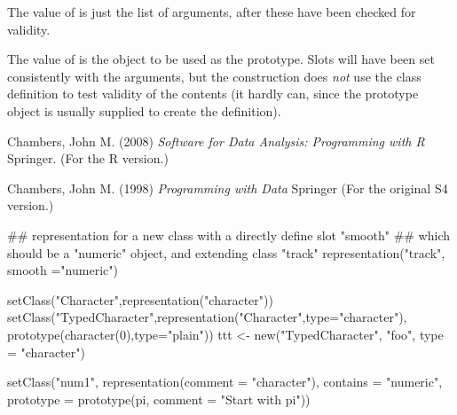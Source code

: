 %
\begin{Value}
The value of   is just the list of arguments, after these have been checked
for validity.

The value of  is the object to be used as the
prototype.  Slots will have been set consistently with the
arguments, but the construction does \emph{not} use the class
definition to test validity of the contents (it hardly can, since
the prototype object is usually supplied to create the definition).
\end{Value}
%
\begin{References}\relax
Chambers, John M. (2008)
\emph{Software for Data Analysis: Programming with R}
Springer.  (For the R version.)

Chambers, John M. (1998)
\emph{Programming with Data}
Springer (For the original S4 version.)
\end{References}
%
\begin{SeeAlso}\relax
\end{SeeAlso}
%
\begin{Examples}
\begin{ExampleCode}
## representation for a new class with a directly define slot "smooth"
## which should be a "numeric" object, and extending class "track"
representation("track", smooth ="numeric")


setClass("Character",representation("character"))
setClass("TypedCharacter",representation("Character",type="character"),
          prototype(character(0),type="plain"))
ttt <- new("TypedCharacter", "foo", type = "character")


setClass("num1", representation(comment = "character"),
         contains = "numeric",
         prototype = prototype(pi, comment = "Start with pi"))



\end{ExampleCode}
\end{Examples}
